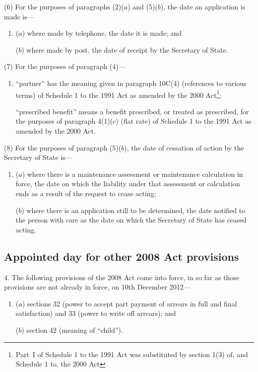 \documentclass[12pt,a4paper]{article}
\begin{document}
(6) For the purposes of paragraphs (2)($a$)  and (5)($b$), the date an application is made is—
\begin{enumerate}\item[]
($a$) where made by telephone, the date it is made; and

($b$) where made by post, the date of receipt by the Secretary of State.
\end{enumerate}

(7) For the purposes of paragraph (4)—
\begin{enumerate}\item[]
“partner” has the meaning given in paragraph 10C(4) (references to various terms) of Schedule 1 to the 1991 Act as amended by the 2000 Act\footnote{Part~I of Schedule 1 to the 1991 Act was substituted by section 1(3) of, and Schedule 1 to, the 2000 Act};

“prescribed benefit” means a benefit prescribed, or treated as prescribed, for the purposes of paragraph 4(1)($c$)  (flat rate) of Schedule 1 to the 1991 Act as amended by the 2000 Act.
\end{enumerate}

(8) For the purposes of paragraph (5)($b$), the date of cessation of action by the Secretary of State is—
\begin{enumerate}\item[]
($a$) where there is a maintenance assessment or maintenance calculation in force, the date on which the liability under that assessment or calculation ends as a result of the request to cease acting;

($b$) where there is an application still to be determined, the date notified to the person with care as the date on which the Secretary of State has ceased acting.
\end{enumerate}

\subsection[4. Appointed day for other 2008 Act provisions]{Appointed day for other 2008 Act provisions}

4.  The following provisions of the 2008 Act come into force, in so far as those provisions are not already in force, on 10th December 2012—
\begin{enumerate}\item[]
($a$) sections 32 (power to accept part payment of arrears in full and final satisfaction) and 33 (power to write off arrears); and

($b$) section 42 (meaning of “child”).
\end{enumerate}
\end{document}

